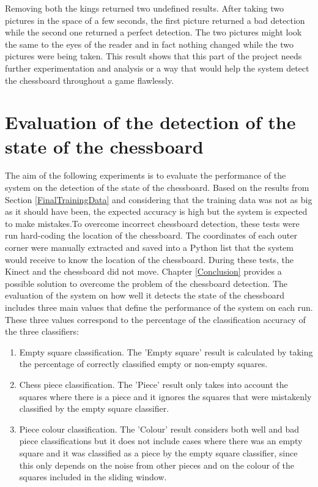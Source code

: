 \documentclass{l4proj}
\begin{document}
Removing both the kings returned two undefined results. After taking two pictures in the space of a few seconds, the first picture returned a bad detection while the second one returned a perfect detection. The two pictures might look the same to the eyes of the reader and in fact nothing changed while the two pictures were being taken. This result shows that this part of the project needs further experimentation and analysis or a way that would help the system detect the chessboard throughout a game flawlessly.

\section{Evaluation of the detection of the state of the chessboard}

The aim of the following experiments is to evaluate the performance of the system on the detection of the state of the chessboard. Based on the results from Section \ref{FinalTrainingData} and considering that the training data was not as big as it should have been, the expected accuracy is high but the system is expected to make mistakes.To overcome incorrect chessboard detection, these tests were run hard-coding the location of the chessboard. The coordinates of each outer corner were manually extracted and saved into a Python list that the system would receive to know the location of the chessboard. During these tests, the Kinect and the chessboard did not move. Chapter \ref{Conclusion} provides a possible solution to overcome the problem of the chessboard detection. The evaluation of the system on how well it detects the state of the chessboard includes three main values that define the performance of the system on each run. These three values correspond to the percentage of the classification accuracy of the three classifiers:

\begin{enumerate}
	
	\item Empty square classification. The 'Empty square' result is calculated by taking the percentage of correctly classified empty or non-empty squares. 
	
	\item Chess piece classification. The 'Piece' result only takes into account the squares where there is a piece and it ignores the squares that were mistakenly classified by the empty square classifier.

	\item Piece colour classification. The 'Colour' result considers both well and bad piece classifications but it does not include cases where there was an empty square and it was classified as a piece by the empty square classifier, since this only depends on the noise from other pieces and on the colour of the squares included in the sliding window.
	
\end{enumerate}
\end{document}
